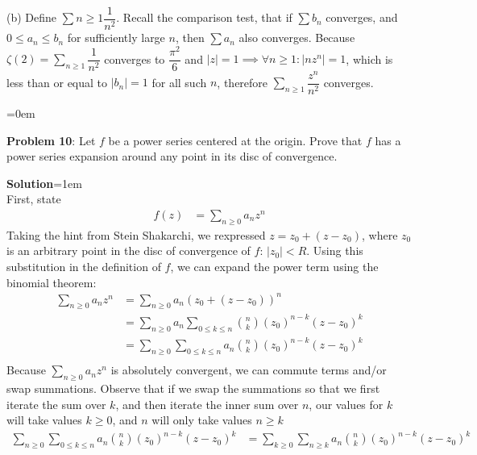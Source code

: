 \documentclass{article}
\begin{document}
(b) Define $\sum\limits{n\geq 1} \dfrac{1}{n^2}$. Recall the comparison test, that if $\sum b_n$ converges, and $0 \leq a_n \leq b_n$ for sufficiently large $n$, then $\sum a_n$ also converges. Because $\zeta(2) = \sum\limits_{n\geq 1} \dfrac{1}{n^2}$ converges to $\dfrac{\pi^2}{6}$ and $|z| = 1 \implies \forall n \geq 1: |nz^n| = 1$, which is less than or equal to $|b_n| = 1$ for all such $n$, therefore $\sum\limits_{n \geq 1}\dfrac{z^n}{n^2}$ converges.

\newpage\parskip=0em
\begin{mdframed}[backgroundcolor=blue!20]
\textbf{Problem 10}: Let $f$ be a power series centered at the origin. Prove that $f$ has a power series expansion around any point in its disc of convergence.
\end{mdframed}
\textbf{Solution}\parskip=1em\\
First, state 
\begin{align*}
    f(z) &= \sum\limits_{n\geq 0} a_nz^n
\end{align*}
Taking the hint from Stein Shakarchi, we rexpressed $z = z_0 + (z - z_0)$, where $z_0$ is an arbitrary point in the disc of convergence of $f$: $|z_0| < R$. Using this substitution in the definition of $f$, we can expand the power term using the binomial theorem:
\begin{align*}
    \sum\limits_{n\geq 0} a_nz^n &= \sum\limits_{n\geq 0} a_n(z_0 + (z - z_0))^n\\
    &= \sum\limits_{n\geq 0} a_n\sum\limits_{0 \leq k \leq n}{n\choose k} (z_0)^{n-k}(z - z_0)^k\\
    &= \sum\limits_{n\geq 0}\sum\limits_{0 \leq k \leq n} a_n{n\choose k} (z_0)^{n-k}(z - z_0)^k\\
\end{align*}
Because $\sum\limits_{n \geq 0}a_nz^n$ is absolutely convergent, we can commute terms and/or swap summations. Observe that if we swap the summations so that we first iterate the sum over $k$, and then iterate the inner sum over $n$, our values for $k$ will take values $k\geq 0$, and $n$ will only take values $n\geq k$
\begin{align*}
    \sum\limits_{n\geq 0}\sum\limits_{0 \leq k \leq n} a_n{n\choose k} (z_0)^{n-k}(z - z_0)^k &= \sum\limits_{k\geq 0}\sum\limits_{n \geq k} a_n{n\choose k} (z_0)^{n-k}(z - z_0)^k\\
\end{align*}
\end{document}
